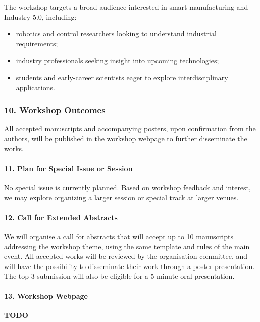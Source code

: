 \documentclass{article}
\begin{document}
The workshop targets a broad audience interested in smart manufacturing and Industry 5.0, including:
\begin{itemize}
    \item robotics and control researchers looking to understand industrial requirements;
    \item industry professionals seeking insight into upcoming technologies;
    \item students and early-career scientists eager to explore interdisciplinary applications.
\end{itemize}



\subsubsection*{10. Workshop Outcomes}
All accepted manuscripts and accompanying posters, upon confirmation from the authors, will be published in the workshop webpage to further disseminate the works.


\paragraph{11. Plan for Special Issue or Session}
No special issue is currently planned. 
Based on workshop feedback and interest, we may explore organizing a larger session or special track at larger venues.


\paragraph{12. Call for Extended Abstracts} 
We will organise a call for abstracts that will accept up to 10 manuscripts addressing the workshop theme, using the same template and rules of the main event.
All accepted works will be reviewed by the organisation committee, and will have the possibility to disseminate their work through a poster presentation.
The top 3 submission will also be eligible for a 5 minute oral presentation.


\paragraph{13. Workshop Webpage} \textbf{TODO}
\end{document}
